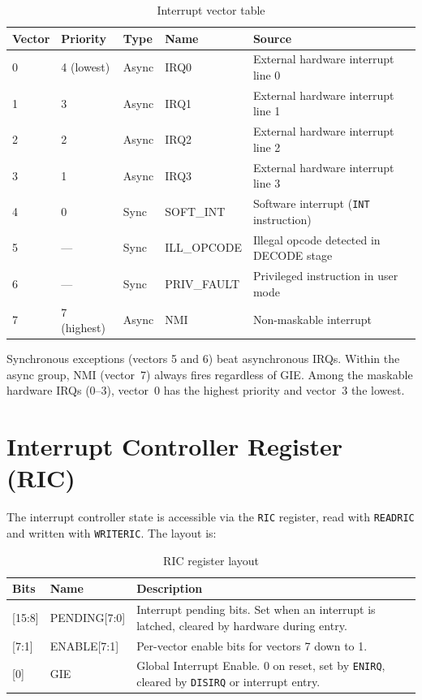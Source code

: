 \documentclass[a4paper,12pt]{report}
\newcommand{\asm}[1]{\texttt{#1}}
\begin{document}
\begin{table}[htbp]
\centering
\caption{Interrupt vector table}
\label{tab:vectors}
\begin{tabularx}{\textwidth}{llllX}
    \toprule
    \textbf{Vector} & \textbf{Priority} & \textbf{Type} & \textbf{Name} & \textbf{Source} \\
    \midrule
    0 & 4 (lowest)  & Async & IRQ0       & External hardware interrupt line 0 \\
    1 & 3           & Async & IRQ1       & External hardware interrupt line 1 \\
    2 & 2           & Async & IRQ2       & External hardware interrupt line 2 \\
    3 & 1           & Async & IRQ3       & External hardware interrupt line 3 \\
    4 & 0           & Sync  & SOFT\_INT  & Software interrupt (\asm{INT} instruction) \\
    5 & ---         & Sync  & ILL\_OPCODE & Illegal opcode detected in DECODE stage \\
    6 & ---         & Sync  & PRIV\_FAULT & Privileged instruction in user mode \\
    7 & 7 (highest) & Async & NMI        & Non-maskable interrupt \\
    \bottomrule
\end{tabularx}
\end{table}

Synchronous exceptions (vectors 5 and 6) beat asynchronous IRQs. Within the async group, NMI (vector~7) always fires regardless of GIE. Among the maskable hardware IRQs (0--3), vector~0 has the highest priority and vector~3 the lowest.

\section{Interrupt Controller Register (RIC)}
\label{sec:ric}

The interrupt controller state is accessible via the \asm{RIC} register, read with \asm{READRIC} and written with \asm{WRITERIC}. The layout is:

\begin{table}[htbp]
\centering
\caption{RIC register layout}
\begin{tabularx}{\textwidth}{llX}
    \toprule
    \textbf{Bits} & \textbf{Name} & \textbf{Description} \\
    \midrule
    {[15:8]} & PENDING[7:0] & Interrupt pending bits. Set when an interrupt is latched, cleared by hardware during entry. \\
    {[7:1]}  & ENABLE[7:1]  & Per-vector enable bits for vectors 7 down to 1. \\
    {[0]}    & GIE          & Global Interrupt Enable. 0 on reset, set by \asm{ENIRQ}, cleared by \asm{DISIRQ} or interrupt entry. \\
    \bottomrule
\end{tabularx}
\end{table}
\end{document}
